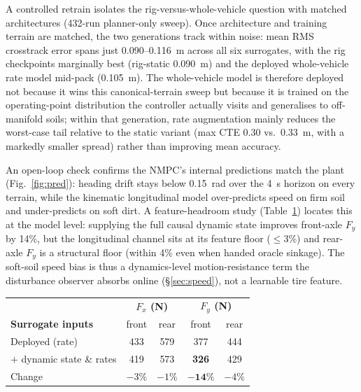 \documentclass{acmd2026_fullpaper}
\begin{document}
A controlled retrain isolates the rig-versus-whole-vehicle question with matched
architectures (432-run planner-only sweep). Once architecture and training
terrain are matched, the two generations track within noise: mean RMS crosstrack
error spans just 0.090--0.116~m across all six surrogates, with the rig
checkpoints marginally best (rig-static 0.090~m) and the deployed whole-vehicle
rate model mid-pack (0.105~m). The whole-vehicle model is therefore deployed not
because it wins this canonical-terrain sweep but because it is trained on the
operating-point distribution the controller actually visits and generalises to
off-manifold soils; within that generation, rate augmentation mainly reduces the
worst-case tail relative to the static variant (max CTE 0.30 vs.\ 0.33~m, with a
markedly smaller spread) rather than improving mean accuracy.

An open-loop check confirms the NMPC's internal predictions match the plant
(Fig.~\ref{fig:pred}): heading drift stays below 0.15~rad over the 4~s horizon on
every terrain, while the kinematic longitudinal model over-predicts speed on firm
soil and under-predicts on soft dirt. A feature-headroom study
(Table~\ref{tab:feat}) locates this at the model level: supplying the full causal
dynamic state improves front-axle $F_y$ by 14\%, but the longitudinal channel
sits at its feature floor ($\le$3\%) and rear-axle $F_y$ is a structural floor
(within 4\% even when handed oracle sinkage). The soft-soil speed bias is thus a
dynamics-level motion-resistance term the disturbance observer absorbs online
(\S\ref{sec:speed}), not a learnable tire feature.

\begin{table}[t]
  \begin{center}
    \vspace{1mm}
    \small
    \begin{tabular}{lcccc}
      \toprule
      & \multicolumn{2}{c}{\textbf{$F_x$ (N)}} & \multicolumn{2}{c}{\textbf{$F_y$ (N)}}\\
      \textbf{Surrogate inputs} & front & rear & front & rear\\
      \midrule
      Deployed (rate)             & 433 & 579 & 377 & 444\\
      $+$ dynamic state \& rates  & 419 & 573 & \textbf{326} & 429\\
      \midrule
      Change                      & $-3\%$ & $-1\%$ & $\mathbf{-14\%}$ & $-4\%$\\
      \bottomrule
    \end{tabular}
    \label{tab:feat}
  \end{center}
\end{table}
\end{document}

